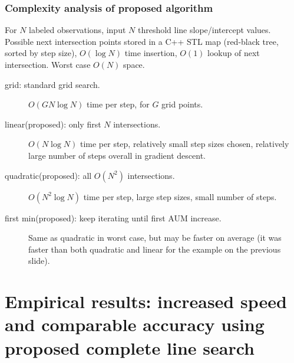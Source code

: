 \documentclass[t]{beamer}
\begin{document}
\begin{frame}
  \frametitle{Complexity analysis of proposed algorithm}

  For $N$ labeled observations, input $N$ threshold line
  slope/intercept values. Possible next intersection points stored in
  a C++ STL map (red-black tree, sorted by step size), $O(\log N)$
  time insertion, $O(1)$ lookup of next intersection. Worst case $O(N)$
  space.
  \begin{description}
  \item[grid: standard grid search.] $O(G N\log N)$ time per step, 
    for $G$ grid points.
  \item[linear(proposed): only first $N$ intersections.]
    $O(N\log N)$ time per step, relatively small step sizes chosen,
    relatively large number of steps overall in gradient descent.
  \item[quadratic(proposed): all $O(N^2)$ intersections.]
    $O(N^2\log N)$ time per step, large step sizes, small number of
    steps.
  \item[first min(proposed): keep iterating until first AUM increase.]
    Same as quadratic in worst case, but may be faster on average (it
    was faster than both quadratic and linear for the example on the
    previous slide).
  \end{description}
\end{frame}

\section{Empirical results: increased speed and comparable accuracy using proposed complete line search} 
\end{document}
